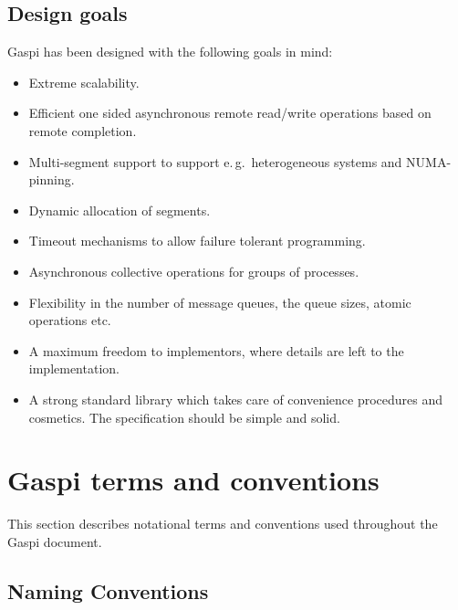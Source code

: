 \documentclass[a4paper]{article}
\newlength{\st}\setlength{\st}{0pt}
\newcommand{\GASPI}{{\sc Gaspi}}
\newcommand{\eg}{e.\,g.\ }
\begin{document}
\subsection{Design goals}

\GASPI{} has been designed with the following goals in mind:

\begin{itemize}
\item Extreme scalability.
\item Efficient one sided asynchronous remote read/write operations based on remote completion.
\item Multi-segment support to support \eg heterogeneous systems and NUMA-pinning.
\item Dynamic allocation of segments.
\item Timeout mechanisms to allow failure tolerant programming.
\item Asynchronous collective operations for groups of processes.
\item Flexibility in the number of message queues, the queue sizes, atomic
  operations etc.
\item A maximum freedom to implementors, where details are left to the
  implementation.
\item A strong standard library which takes care of convenience
  procedures and cosmetics. The specification should be simple and solid.
\end{itemize}


\section{\GASPI{} terms and conventions}

This section describes notational terms and conventions used
throughout the \GASPI{} document.


\subsection{Naming Conventions}
\end{document}

